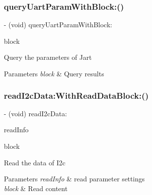 \subsubsection{\texorpdfstring{query\+Uart\+Param\+With\+Block\+:()}{queryUartParamWithBlock:()}}
{\footnotesize\ttfamily -\/ (void) query\+Uart\+Param\+With\+Block\+: \begin{DoxyParamCaption}\item[{(P\+V\+Query\+Uart\+Param\+Block)}]{block }\end{DoxyParamCaption}}

Query the parameters of Jart


\begin{DoxyParams}{Parameters}
{\em block} & Query results \\
\hline
\end{DoxyParams}
\mbox{\label{interface_p_v_mount_a82425bd5d56955ff594f4310c0f49787}} 
\subsubsection{\texorpdfstring{read\+I2c\+Data\+:\+With\+Read\+Data\+Block\+:()}{readI2cData:WithReadDataBlock:()}}
{\footnotesize\ttfamily -\/ (void) read\+I2c\+Data\+: \begin{DoxyParamCaption}\item[{(\hyperlink{struct_p_v_s_d_k___m_o_u_n_t_a_p_i___r_e_a_d_i2_c___d_a_t_a}{P\+V\+S\+D\+K\+\_\+\+M\+O\+U\+N\+T\+A\+P\+I\+\_\+\+R\+E\+A\+D\+I2\+C\+\_\+\+D\+A\+TA})}]{read\+Info }\item[{WithReadDataBlock:(P\+V\+S\+D\+K\+Read\+I2c\+Data\+Block)}]{block }\end{DoxyParamCaption}}

Read the data of I2c


\begin{DoxyParams}{Parameters}
{\em read\+Info} & read parameter settings \\
\hline
{\em block} & Read content \\
\hline
\end{DoxyParams}
\mbox{\label{interface_p_v_mount_a04865a30db32f8eba0d5a94d118cc6c2}} 
